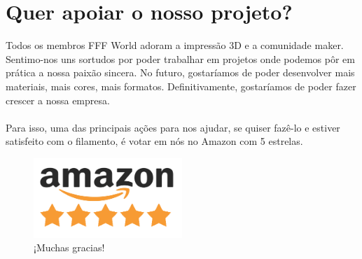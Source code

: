 \documentclass[11pt,a4paper]{article}
\begin{document}
\section{Quer apoiar o nosso projeto?}
Todos os membros FFF World adoram a impressão 3D e a comunidade maker. Sentimo-nos uns sortudos por poder trabalhar em projetos onde podemos pôr em prática a nossa paixão sincera. No futuro, gostaríamos de poder desenvolver mais materiais, mais cores, mais formatos. Definitivamente, gostaríamos de poder fazer crescer a nossa empresa.
\\\\
Para isso, uma das principais ações para nos ajudar, se quiser fazê-lo e estiver satisfeito com o filamento, é votar em nós no Amazon com 5 estrelas.
\begin{figure}[H]
\centering
\includegraphics[width=0.5\textwidth,cfbox=azul_marcos 1pt 0pt]{FOTOS/AMAZON_FIVE_STARS}
\caption*{¡Muchas gracias!}
\end{figure}
\end{document}
